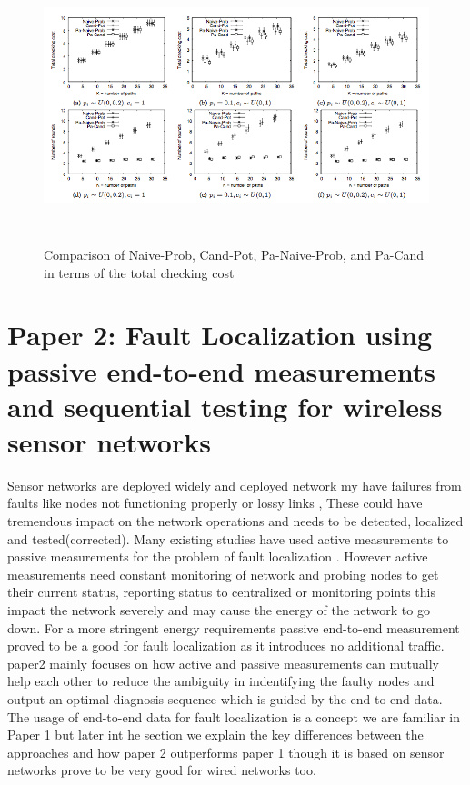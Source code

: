 \documentclass[10pt]{sigplan-proc-varsize}
\begin{document}
\begin{figure}
  \includegraphics[width=\textwidth,height=8cm]{Fig14}
  \caption{Comparison of Naive-Prob, Cand-Pot, Pa-Naive-Prob, and Pa-Cand in terms of the total checking cost}
\end{figure}

\section{Paper 2: Fault Localization using passive end-to-end measurements and
sequential testing for wireless sensor networks}
Sensor networks are deployed widely and deployed network my have failures from faults like nodes not functioning properly or lossy links\cite{Ramanathan:05} \cite{Tolle:05}, These could have tremendous impact on the network operations and needs to be detected, localized and tested(corrected). Many existing studies have used active measurements to passive measurements for the problem of fault localization \cite{Ramanathan:05} . However active measurements need constant monitoring of network and probing nodes to get their current status, reporting status to centralized or monitoring points this impact the network severely and may cause the energy of the network to go down. For a more stringent energy requirements    
passive end-to-end measurement proved to be a good for fault localization as it introduces no additional traffic. \cite{krishna:12} paper2 mainly focuses on how active and passive measurements can mutually help each other to reduce the  ambiguity in indentifying the faulty nodes and output an optimal diagnosis sequence which is guided by the end-to-end data. The usage of end-to-end data for fault localization is a concept we are familiar in Paper 1 \cite{pclee:07} but later int he section we explain the key differences between the approaches and how paper 2 \cite{krishna:12} outperforms paper 1 though it is based on sensor networks prove to be very good for wired networks too.
\end{document}
